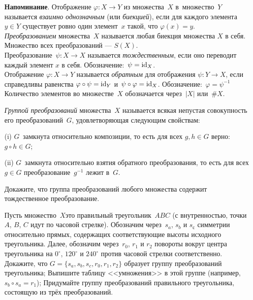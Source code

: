 \documentclass[a4paper,11pt]{article}
\begin{document}

{\small
\noindent\textbf{Напоминание}.
Отображение $\varphi\colon X\to Y$ из множества~$X$ в~множество~$Y$ называется \emph{взаимно однозначным} (или \emph{биекцией}), если для каждого элемента $y\in Y$ существует ровно один элемент~$x$ такой, что $\varphi(x)=y$.
\\
\emph{Преобразованием} множества~$X$ называется любая биекция множества $X$ в себя.
Множество всех преобразований — $S(X)$.
\\
Преобразование~$\psi\colon X\to X$ называется \emph{тождественным}, если оно переводит каждый элемент $x$ в себя.
Обозначение:~$\psi=\operatorname{id}_X$.
\\
Отображение $\varphi\colon X\to Y$ называется \emph{обратным} для отображения $\psi\colon Y\to X$, если справедливы равенства $\varphi\circ\psi=\operatorname{id}_Y$ и~$\psi\circ\varphi=\operatorname{id}_X$.
Обозначение:~$\varphi=\psi^{-1}$
\\
Количество элементов во множестве~$X$ обозначается через~$|X|$ или~$\#X$.
\par
}

\emph{Группой преобразований} множества~$X$ называется всякая непустая совокупность его преобразований~$G$, удовлетворяющая следующим свойствам:
\begin{items}{-5}
\item[(i)]
$G$~замкнута относительно композиции, то есть для всех $g,h\in G$ верно: $g\circ h\in G$;
\item[(ii)]
$G$~замкнута относительно взятия обратного преобразования, то есть для всех $g\in G$  преобразование~$g^{-1}$ лежит в~$G$.
\end{items}
\vspace*{-3mm}

Докажите, что группа преобразований любого множества содержит тождественное преобразование.



\label{triangle}
Пусть множество~$X$\т это правильный треугольник~$ABC$ (с внутренностью, точки $A$, $B$, $C$ идут по часовой стрелке).
Обозначим через~$s_{a}$, $s_{b}$ и $s_с$ симметрии относительно прямых,
содержащих соответствующие высоты исходного треугольника.
Далее, обозначим через~$r_0$, $r_1$ и $r_2$ повороты вокруг центра треугольника на $0^\circ$, $120^\circ$ и $240^\circ$ против часовой стрелки соответственно.
Докажите, что $G=\{s_{a},s_{b},s_{c},r_0,r_1,r_2\}$ образует группу преобразований треугольника;
Выпишите таблицу <<умножения>> в этой группе (например, $s_b\circ s_a = r_1$);
Придумайте группу преобразований правильного треугольника, состоящую из трёх преобразований.
\end{document}
